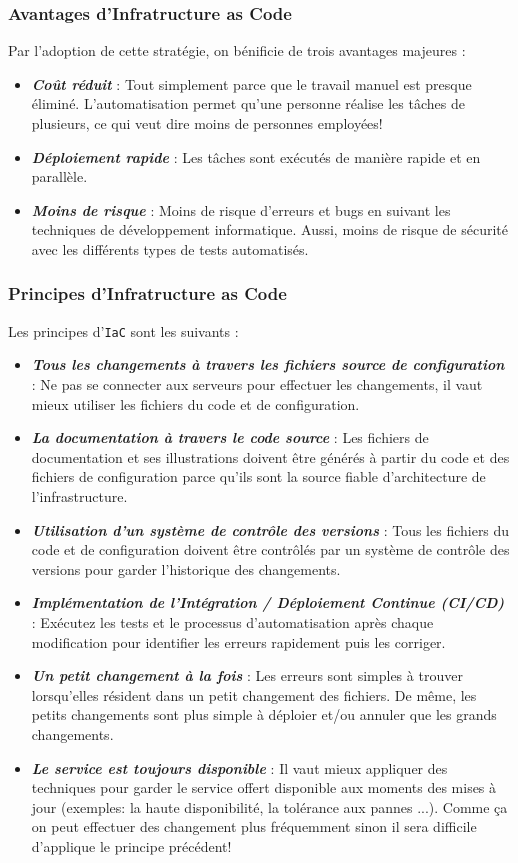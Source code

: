 \subsubsection{Avantages d'Infratructure as Code}

Par l'adoption de cette stratégie, on bénificie de trois avantages majeures :
\begin{itemize}
  \item\textbf{\emph{Coût réduit}} : Tout simplement parce que le travail manuel est presque éliminé. L'automatisation permet qu'une personne réalise les tâches de plusieurs, ce qui veut dire moins de personnes employées!
  \item\textbf{\emph{Déploiement rapide}} : Les tâches sont exécutés de manière rapide et en parallèle. 
  \item\textbf{\emph{Moins de risque}} : Moins de risque d'erreurs et bugs en suivant les techniques de développement informatique. Aussi, moins de risque de sécurité avec les différents types de tests automatisés.
\end{itemize}

\subsubsection{Principes d'Infratructure as Code}

Les principes d'\texttt{IaC} sont les suivants :
\begin{itemize}
  \item\textbf{\emph{Tous les changements à travers les fichiers source de configuration}} : Ne pas se connecter aux serveurs pour effectuer les changements, il vaut mieux utiliser les fichiers du code et de configuration.
  \item\textbf{\emph{La documentation à travers le code source}} : Les fichiers de documentation et ses illustrations doivent être générés à partir du code et des fichiers de configuration parce qu'ils sont la source fiable d'architecture de l'infrastructure.
  \item\textbf{\emph{Utilisation d'un système de contrôle des versions}} : Tous les fichiers du code et de configuration doivent être contrôlés par un système de contrôle des versions pour garder l'historique des changements.
  \item\textbf{\emph{Implémentation de l'Intégration / Déploiement Continue (CI/CD)}} : Exécutez les tests et le processus d'automatisation après chaque modification pour identifier les erreurs rapidement puis les corriger. 
  \item\textbf{\emph{Un petit changement à la fois}} : Les erreurs sont simples à trouver lorsqu'elles résident dans un petit changement des fichiers. De même, les petits changements sont plus simple à déploier et/ou annuler que les grands changements.
  \item\textbf{\emph{Le service est toujours disponible}} : Il vaut mieux appliquer des techniques pour garder le service offert disponible aux moments des mises à jour (exemples: la haute disponibilité, la tolérance aux pannes ...). Comme ça on peut effectuer des changement plus fréquemment sinon il sera difficile d'applique le principe précédent!
\end{itemize}

